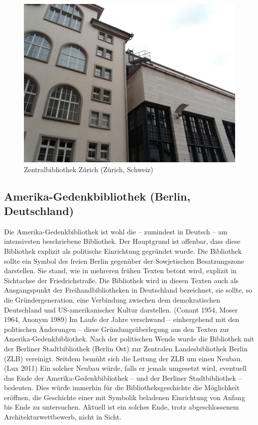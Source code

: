 \documentclass[a4paper,
fontsize=11pt,
oneside,
numbers=noperiodatend,
parskip=half-,
bibliography=totoc,
final
]{scrartcl}
\begin{document}
\begin{figure}[htbp]
\centering
\includegraphics{./img/021.jpg}
\caption{Zentralbibliothek Zürich (Zürich,
Schweiz)}
\end{figure}

\subsection*{Amerika-Gedenkbibliothek (Berlin,
Deutschland)}\label{amerika-gedenkbibliothek-berlin-deutschland}

Die Amerika-Gedenkbibliothek ist wohl die -- zumindest in Deutsch -- am
intensivsten beschriebene Bibliothek. Der Hauptgrund ist offenbar, dass
diese Bibliothek explizit als politische Einrichtung gegründet wurde.
Die Bibliothek sollte ein Symbol des freien Berlin gegenüber der
Sowjetischen Besatzungszone darstellen. Sie stand, wie in mehreren
frühen Texten betont wird, explizit in Sichtachse der Friedrichstraße.
Die Bibliothek wird in diesen Texten auch als Ausgangspunkt der
Freihandbibliotheken in Deutschland bezeichnet, sie sollte, so die
Gründergeneration, eine Verbindung zwischen dem demokratischen
Deutschland und US-amerikanischer Kultur darstellen. (Conant 1954, Moser
1964, Anonym 1989) Im Laufe der Jahre verschwand -- einhergehend mit den
politischen Änderungen -- diese Gründungsüberlegung aus den Texten zur
Amerika-Gedenkbibliothek. Nach der politischen Wende wurde die
Bibliothek mit der Berliner Stadtbibliothek (Berlin Ost) zur Zentralen
Landesbibliothek Berlin (ZLB) vereinigt. Seitdem bemüht sich die Leitung
der ZLB um einen Neubau. (Lux 2011) Ein solcher Neubau würde, falls er
jemals umgesetzt wird, eventuell das Ende der Amerika-Gedenkbibliothek
-- und der Berliner Stadtbibliothek -- bedeuten. Dies würde immerhin für
die Bibliotheksgeschichte die Möglichkeit eröffnen, die Geschichte einer
mit Symbolik beladenen Einrichtung von Anfang bis Ende zu untersuchen.
Aktuell ist ein solches Ende, trotz abgeschlossenem
Architekturwettbewerb, nicht in Sicht.
\end{document}
